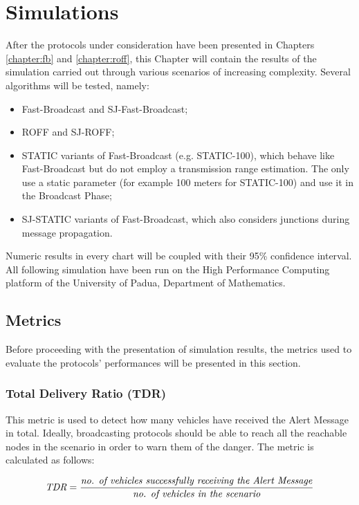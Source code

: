 

\chapter{Simulations}
	\label{chapter:simulations}
	After the protocols under consideration have been presented in Chapters \ref{chapter:fb} and \ref{chapter:roff}, this Chapter will contain the results of the simulation carried out through various scenarios of increasing complexity. Several algorithms will be tested, namely:
	\begin{itemize}
		\item Fast-Broadcast and SJ-Fast-Broadcast;
		\item ROFF and SJ-ROFF;
		\item STATIC variants of Fast-Broadcast (e.g. STATIC-100), which behave like Fast-Broadcast but do not employ a transmission range estimation. The only use a static parameter (for example 100 meters for STATIC-100) and use it in the Broadcast Phase;
		\item SJ-STATIC variants of Fast-Broadcast, which also considers junctions during message propagation.
	\end{itemize}
	
	
	Numeric results in every chart will be coupled with their 95\% confidence interval. All following simulation have been run on the High Performance Computing platform of the University of Padua, Department of Mathematics\cite{cluster}.
	
	\section{Metrics}
		\label{sec:metrics}
		Before proceeding with the presentation of simulation results, the metrics used to evaluate the protocols' performances will be presented in this section. 
		
		\subsection{Total Delivery Ratio (TDR)}
			\label{ssec:tdr}
			This metric is used to detect how many vehicles have received the Alert Message in total. Ideally, broadcasting protocols should be able to reach all the reachable nodes in the scenario in order to warn them of the danger. The metric is calculated as follows:
			
			\begin{gather}
				\label{eq:tdr}
				\textit{TDR} = \frac{\textrm{\textit{no. of vehicles successfully receiving the Alert Message}}}{\textrm{\textit{no. of vehicles in the scenario}}}
			\end{gather}
			
